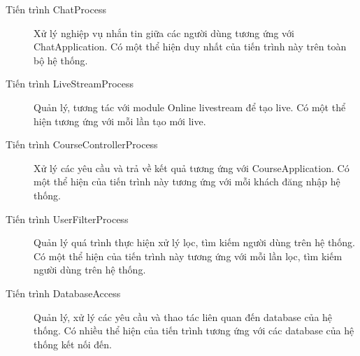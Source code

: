 \documentclass[./../main_file.tex]{subfiles}
\begin{document}
\begin{description}
		\item[Tiến trình ChatProcess] Xử lý nghiệp vụ nhắn tin giữa các người dùng tương ứng với ChatApplication. Có một thể hiện duy nhất của tiến trình này trên toàn bộ hệ thống.
		\item[Tiến trình LiveStreamProcess] Quản lý, tương tác với module Online livestream để tạo live. Có một thể hiện tương ứng với mỗi lần tạo mới live.
		\item[Tiến trình CourseControllerProcess] Xử lý các yêu cầu và trả về kết quả tương ứng với CourseApplication. Có một thể hiện của tiến trình này tương ứng với mỗi khách đăng nhập hệ thống.
		\item[Tiến trình UserFilterProcess] Quản lý quá trình thực hiện xử lý lọc, tìm kiếm người dùng trên hệ thống. 
		Có một thể hiện của tiến trình này tương ứng với mỗi lần lọc, tìm kiếm người dùng trên hệ thống.
		\item[Tiến trình DatabaseAccess] Quản lý, xử lý các yêu cầu và thao tác liên quan đến database của hệ thống. Có nhiều thể hiện của tiến trình tương ứng với các database của hệ thống kết nối đến.
	\end{description}
\end{document}
